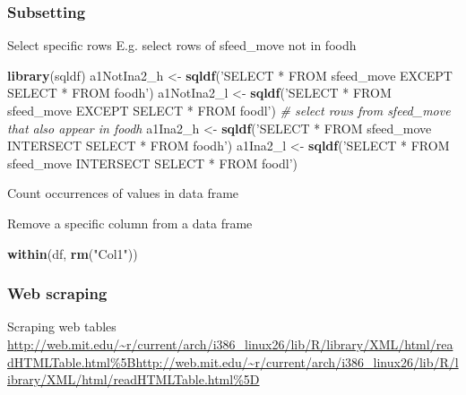 \documentclass[10,portrait]{article}
\newenvironment{Shaded}{\begin{snugshade}}{\end{snugshade}}
\newcommand{\KeywordTok}[1]{\textcolor[rgb]{0.13,0.29,0.53}{\textbf{#1}}}
\newcommand{\StringTok}[1]{\textcolor[rgb]{0.31,0.60,0.02}{#1}}
\newcommand{\CommentTok}[1]{\textcolor[rgb]{0.56,0.35,0.01}{\textit{#1}}}
\newcommand{\OperatorTok}[1]{\textcolor[rgb]{0.81,0.36,0.00}{\textbf{#1}}}
\newcommand{\NormalTok}[1]{#1}
\begin{document}
\subsubsection{Subsetting}\label{subsetting}

Select specific rows E.g. select rows of sfeed\_move not in foodh

\begin{Shaded}
\begin{Highlighting}[]
\KeywordTok{library}\NormalTok{(sqldf)}
\NormalTok{a1NotIna2_h  <-}\StringTok{ }\KeywordTok{sqldf}\NormalTok{(}\StringTok{'SELECT * FROM sfeed_move EXCEPT SELECT * FROM foodh'}\NormalTok{)}
\NormalTok{a1NotIna2_l  <-}\StringTok{ }\KeywordTok{sqldf}\NormalTok{(}\StringTok{'SELECT * FROM sfeed_move EXCEPT SELECT * FROM foodl'}\NormalTok{)}
\CommentTok{# select rows from sfeed_move that also appear in foodh}
\NormalTok{a1Ina2_h  <-}\StringTok{ }\KeywordTok{sqldf}\NormalTok{(}\StringTok{'SELECT * FROM sfeed_move INTERSECT SELECT * FROM foodh'}\NormalTok{)}
\NormalTok{a1Ina2_l  <-}\StringTok{ }\KeywordTok{sqldf}\NormalTok{(}\StringTok{'SELECT * FROM sfeed_move INTERSECT SELECT * FROM foodl'}\NormalTok{)}
\end{Highlighting}
\end{Shaded}

Count occurrences of values in data frame

\begin{Shaded}
\end{Shaded}

Remove a specific column from a data frame

\begin{Shaded}
\begin{Highlighting}[]
\KeywordTok{within}\NormalTok{(df, }\KeywordTok{rm}\NormalTok{(}\StringTok{"Col1"}\NormalTok{))}
\end{Highlighting}
\end{Shaded}

\subsubsection{Web scraping}\label{web-scraping}

Scraping web tables\\
\url{http://web.mit.edu/~r/current/arch/i386_linux26/lib/R/library/XML/html/readHTMLTable.html\%5Bhttp://web.mit.edu/~r/current/arch/i386_linux26/lib/R/library/XML/html/readHTMLTable.html\%5D}
\end{document}
